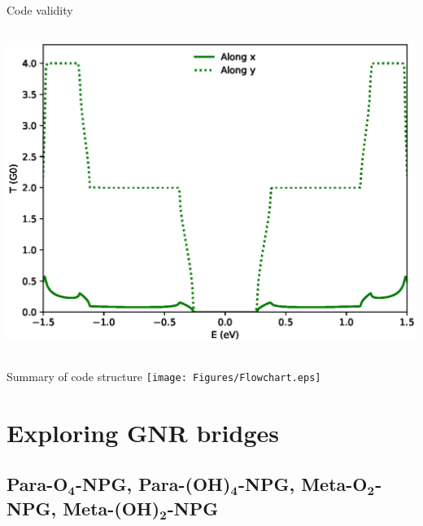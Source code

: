 \documentclass[hyperref={colorlinks=true,urlcolor=blue,linkcolor=.},aspectratio=1610,mathserif]{beamer}
\newcommand*\mathinhead[2]{\texorpdfstring{$\boldsymbol{#1}$}{#2}}
\begin{document}
\begin{frame}{Code validity}
\begin{overprint}
\begin{columns}[t]
    \includegraphics[width=.97\textwidth]{Figures/txy_AVER.eps}
\end{columns}
\end{overprint}
\end{frame}

\begin{frame}{Summary of code structure}
\centering
\texttt{[image: Figures/Flowchart.eps]}
\end{frame}

\section{Exploring GNR bridges}
\subsection{Para-O\mathinhead{_4}{_4}-NPG, Para-(OH)\mathinhead{_4}{_4}-NPG, Meta-O\mathinhead{_2}{_2}-NPG, Meta-(OH)\mathinhead{_2}{_2}-NPG}
\end{document}
